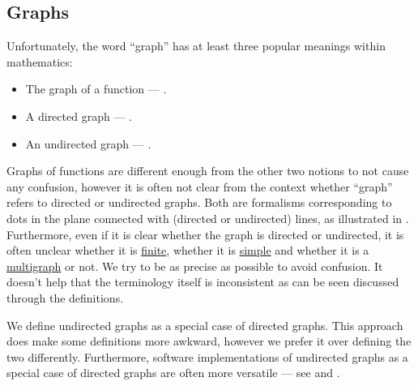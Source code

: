 \subsection{Graphs}\label{subsec:graphs}

\begin{remark}\label{rem:directed_and_undirected_graphs}
  Unfortunately, the word \enquote{graph} has at least three popular meanings within mathematics:
  \begin{itemize}
    \item The graph of a function --- .
    \item A directed graph --- .
    \item An undirected graph --- .
  \end{itemize}

  Graphs of functions are different enough from the other two notions to not cause any confusion, however it is often not clear from the context whether \enquote{graph} refers to directed or undirected graphs. Both are formalisms corresponding to dots in the plane connected with (directed or undirected) lines, as illustrated in . Furthermore, even if it is clear whether the graph is directed or undirected, it is often unclear whether it is \hyperref[def:graph/directed/order]{finite}, whether it is \hyperref[def:graph/directed/simple]{simple} and whether it is a \hyperref[def:multigraph]{multigraph} or not. We try to be as precise as possible to avoid confusion. It doesn't help that the terminology itself is inconsistent as can be seen discussed through the definitions.

  We define undirected graphs as a special case of directed graphs. This approach does make some definitions more awkward, however we prefer it over defining the two differently. Furthermore, software implementations of undirected graphs as a special case of directed graphs are often more versatile --- see \cite[sec. 5.4]{Erickson2019} and \cite[ch. 1, sec. 2.4]{GondranMinoux1984Graphs}.
\end{remark}

